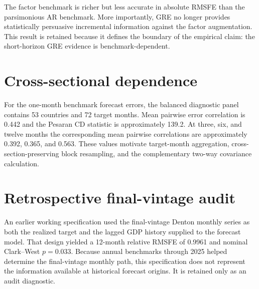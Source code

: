 \documentclass[12pt]{article}
\begin{document}
\begin{table}[htbp]
\centering\scriptsize
\caption{GRE against the wide factor-augmented benchmark at one month}
\end{table}
The factor benchmark is richer but less accurate in absolute RMSFE than the parsimonious AR benchmark. More importantly, GRE no longer provides statistically persuasive incremental information against the factor augmentation. This result is retained because it defines the boundary of the empirical claim: the short-horizon GRE evidence is benchmark-dependent.

\section{Cross-sectional dependence}
For the one-month benchmark forecast errors, the balanced diagnostic panel contains 53 countries and 72 target months. Mean pairwise error correlation is 0.442 and the Pesaran CD statistic is approximately 139.2. At three, six, and twelve months the corresponding mean pairwise correlations are approximately 0.392, 0.365, and 0.563. These values motivate target-month aggregation, cross-section-preserving block resampling, and the complementary two-way covariance calculation.

\section{Retrospective final-vintage audit}
An earlier working specification used the final-vintage Denton monthly series as both the realized target and the lagged GDP history supplied to the forecast model. That design yielded a 12-month relative RMSFE of 0.9961 and nominal Clark--West $p=0.033$. Because annual benchmarks through 2025 helped determine the final-vintage monthly path, this specification does not represent the information available at historical forecast origins. It is retained only as an audit diagnostic.
\end{document}
